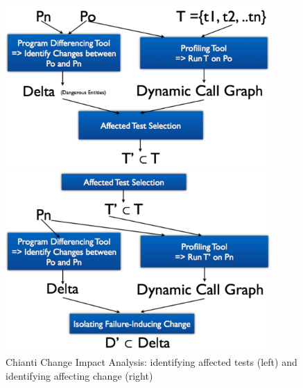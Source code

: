 \begin{figure}
\centering
\begin{minipage}{.45\textwidth}
  \centering
\includegraphics[width=0.9\textwidth]{images/ChiantiPhase1.pdf}
\end{minipage}
\begin{minipage}{.45\textwidth}
  \centering
\includegraphics[width=0.9\textwidth]{images/ChiantiPhase2.pdf}
\end{minipage}
\caption{Chianti Change Impact Analysis: identifying affected tests (left) and identifying affecting change (right)~\cite{Ren2004}} 
\label{fig:twophase} 
\end{figure}

